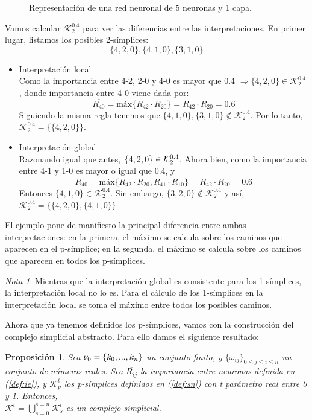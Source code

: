 \documentclass[12pt, a4paper]{article}
\numberwithin{equation}{section}
\theoremstyle{definition}
\newenvironment{ejem}
  {\pushQED{\qed}\renewcommand{\qedsymbol}{$\blacktriangleleft$}\ejemplo}
  {\popQED\endejemplo}
\theoremstyle{remark}
\newtheorem*{remark}{Nota}
\theoremstyle{plain}
\newtheorem{prop}{Proposición}
\begin{document}
\begin{ejem}
\begin{figure}[H]
				\caption{Representación de una red neuronal de 5 neuronas y 1 capa.}
			\end{figure}
			Vamos calcular $\mathcal{K}^{0.4}_{2}$ para ver las diferencias entre las interpretaciones. En primer lugar, 
			listamos los posibles 2-símplices: 
			$$
			\{4,2,0\},\{4,1,0\},\{3,1,0\}
			$$
			\begin{itemize}
				\item{Interpretación local}\\
					Como la importancia entre 4-2, 2-0 y 4-0 es mayor que 0.4 $\Rightarrow\{4,2,0\} \in \mathcal{K}^{0.4}_{2}$,
					donde importancia entre 4-0 viene dada por:
					$$\overline{R_{40}}=\text{máx}\{R_{42} \cdot R_{20}\}=R_{42} \cdot R_{20}=0.6$$
					Siguiendo la misma regla tenemos que $\{4,1,0\},\{3,1,0\} \notin \mathcal{K}^{0.4}_{2}$. Por lo tanto,
					$\mathcal{K}^{0.4}_{2}=\{\{4,2,0\}\}$.
				\item{Interpretación global}\\
					Razonando igual que antes,$\hspace{0.15cm}\{4,2,0\} \in \mathcal{K}^{0.4}_{2}$. Ahora bien, como la importancia
					entre 4-1 y 1-0 es mayor o igual que 0.4, y 
					$$\overline{R_{40}}=\text{máx}\{R_{42} \cdot R_{20},R_{41} \cdot R_{10}\}=R_{42} \cdot R_{20}=0.6$$ 
					Entonces $\{4,1,0\} \in \mathcal{K}^{0.4}_{2}$. Sin embargo, $\{3,2,0\} \notin \mathcal{K}^{0.4}_{2}$ y así,\\ 
					$\mathcal{K}^{0.4}_{2}=\{\{4,2,0\},\{4,1,0\}\}$
			\end{itemize}
			El ejemplo pone de manifiesto la principal diferencia entre ambas interpretaciones: en la primera, el máximo se calcula sobre los caminos
			que aparecen en el p-símplice; en la segunda, el máximo se calcula sobre los caminos que aparecen en todos los p-símplices.
			\begin{remark}
				Mientras que la interpretación global es consistente para los 1-símplices, la interpretación local no lo es. Para el cálculo
				de los 1-símplices en la interpretación local se toma el máximo entre todos los posibles caminos. 
			\end{remark}
		\end{ejem}
		
		Ahora que ya tenemos definidos los p-símplices, vamos con la construcción del complejo simplicial abstracto. Para ello 
		damos el siguiente resultado:
		\begin{prop}
			Sea ${\Large \nu}_{0}=\{k_{0},...,k_{n}\}$ un conjunto finito, y $\{\omega_{ij}\}_{0\leq j \leq i \leq n}$ un 
			conjunto de números reales. Sea $\overline{R_{ij}}$ la importancia entre neuronas 
			definida en (\ref{def:ie}), y $\mathcal{K}_{p}^{t}$ los p-símplices definidos en (\ref{def:sn}) con t
			parámetro real entre 0 y 1. Entonces, \\ 
			$\mathcal{K}^{t}=\bigcup_{s=0}^{s=n}\mathcal{K}_{s}^{t}$ es un complejo simplicial. 
			\label{prop:cs}
		\end{prop}
\end{document}
